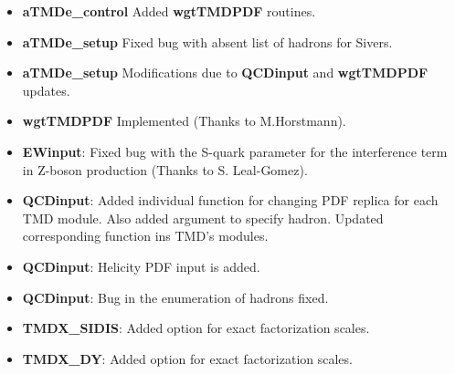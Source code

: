 \documentclass[prd,nofootinbib,eqsecnum,final]{revtex4}
\renewcommand{\(}{\left(}
\renewcommand{\)}{\right)}
\renewcommand{\[}{\left[}
\renewcommand{\]}{\right]}
\begin{document}
\begin{itemize}
\begin{itemize}
	\item \textbf{aTMDe\_control} Added \textbf{wgtTMDPDF} routines.
	\item \textbf{aTMDe\_setup} Fixed bug with absent list of hadrons for Sivers.
	\item \textbf{aTMDe\_setup} Modifications due to \textbf{QCDinput} and \textbf{wgtTMDPDF} updates.
	\item \textbf{wgtTMDPDF} Implemented (Thanks to M.Horstmann).
	\item \textbf{EWinput}: Fixed bug with the S-quark parameter for the interference term in Z-boson production (Thanks to S. Leal-Gomez).
	\item \textbf{QCDinput}: Added individual function for changing PDF replica for each TMD module. Also added argument to specify hadron. Updated corresponding function ins TMD's modules.
	\item \textbf{QCDinput}: Helicity PDF input is added.
	\item \textbf{QCDinput}: Bug in the enumeration of hadrons fixed.
	\item \textbf{TMDX\_SIDIS}: Added option for exact factorization scales.
	\item \textbf{TMDX\_DY}: Added option for exact factorization scales.
\end{itemize}


\end{itemize}
\end{document}
